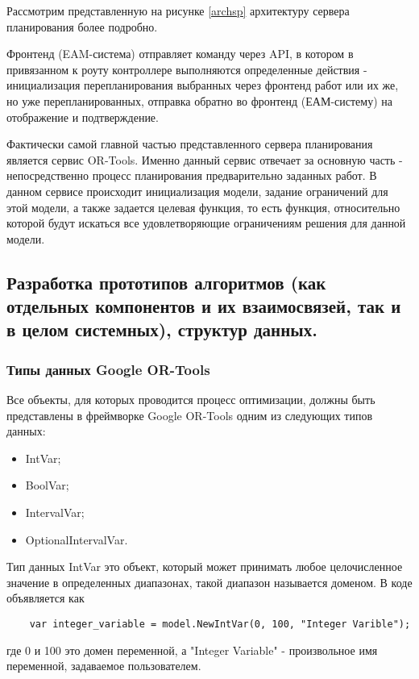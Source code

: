 Рассмотрим представленную на рисунке \ref{archsp} архитектуру сервера планирования более подробно.

Фронтенд (EAM-система) отправляет команду через API, в котором в привязанном к роуту контроллере выполняются определенные действия - инициализация перепланирования выбранных через фронтенд работ или их же, но уже перепланированных, отправка обратно во фронтенд (ЕАМ-систему) на отображение и подтверждение.

Фактически самой главной частью представленного сервера планирования является сервис OR-Tools. Именно данный сервис отвечает за основную часть - непосредственно процесс планирования предварительно заданных работ. В данном сервисе происходит инициализация модели, задание ограничений для этой модели, а также задается целевая функция, то есть функция, относительно которой будут искаться все удовлетворяющие ограничениям решения для данной модели.


\subsection{Разработка прототипов алгоритмов (как отдельных компонентов и их взаимосвязей, так и в целом системных), структур данных.}

\subsubsection{Типы данных Google OR-Tools}

Все объекты, для которых проводится процесс оптимизации, должны быть представлены в фреймворке Google OR-Tools одним из следующих типов данных:

\begin{itemize}
	\item IntVar; 
	\item BoolVar;
	\item IntervalVar;
	\item OptionalIntervalVar.
\end{itemize}

Тип данных IntVar это объект, который может принимать любое целочисленное значение в определенных диапазонах, такой диапазон называется доменом. В коде объявляется как
\begin{lstlisting}
	var integer_variable = model.NewIntVar(0, 100, "Integer Varible");
\end{lstlisting}
где 0 и 100 это домен переменной, а "Integer Variable" - произвольное имя переменной, задаваемое пользователем.

